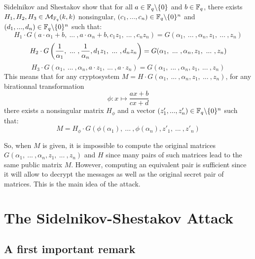 \documentclass[a4paper]{article}
\begin{document}
Sidelnikov and Shestakov show \cite{SidelShes92} that for all $a \in \mathbb{F}_q\backslash\{0\}$ and $b \in \mathbb{F}_q$, there exists $H_1, H_2, H_3 \in \mathcal{M}_{\mathbb{F}_q}(k,k)$ nonsingular, $(c_1,... ,c_n) \in \mathbb{F}_q\backslash\{0\}^{n}$ and $(d_1,... ,d_n) \in \mathbb{F}_q\backslash\{0\}^{n}$ such that:
\begin{equation}
H_1\cdot G(a\cdot\alpha_1 + b, \ ... \ , a\cdot \alpha_n + b, c_1z_1, \ ... \ , c_n z_n) = G(\alpha_1, \ ... \ , \alpha_n, z_1, \ ... \ , z_n)
\label{eq1}
\end{equation}
\begin{equation}
H_2\cdot G\left( \frac{1}{\alpha_1}, \ ... \ , \frac{1}{\alpha_n}, d_1z_1, \ ... \ , d_n z_n \right) = G(\alpha_1, \ ... \ , \alpha_n, z_1, \ ... \ , z_n) \\
\label{eq2}
\end{equation}
\begin{equation}
H_3\cdot G\left( \alpha_1, \ ... \ , \alpha_n, a\cdot z_1, \ ... \ , a\cdot z_n \right) = G(\alpha_1, \ ... \ , \alpha_n, z_1, \ ... \ , z_n)
\label{eq3}
\end{equation}
This means that for any cryptosystem $M = H\cdot G(\alpha_1, \ ... \ , \alpha_n, z_1, \ ... \ , z_n)$, for any birationnal transformation
$$ \phi : x \mapsto \frac{ax+b}{cx+d}$$
there exists a nonsingular matrix $H_{\phi}$ and a vector $(z'_1,... ,z'_n) \in \mathbb{F}_q\backslash\{0\}^{n}$ such that:
\begin{equation}
 M = H_{\phi}\cdot G(\phi(\alpha_1), \ ... \ , \phi(\alpha_n), z'_1, \ ... \ , z'_n)
 \label{eq4}
\end{equation}


So, when $M$ is given, it is impossible to compute the original matrices $G(\alpha_1, \ ... \ , \alpha_n, z_1, \ ... \ , z_n)$ and $H$ since many pairs of such matrices lead to the same public matrix $M$.
However, computing an equivalent pair is sufficient since it will allow to decrypt the messages as well as the original secret pair of matrices.
This is the main idea of the attack.



\section{The Sidelnikov-Shestakov Attack}
\label{sec:SSattack}
\subsection{A first important remark}
\end{document}
